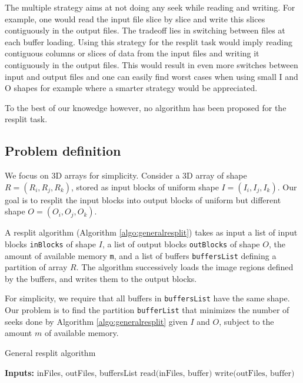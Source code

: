 \documentclass[conference]{IEEEtran}
\begin{document}
The multiple strategy aims at not doing any seek while reading and writing. For
example, one would read the input file slice by slice and write this slices
contiguously in the output files. The tradeoff lies in switching between files
at each buffer loading. Using this strategy for the resplit task would imply
reading contiguous columns or slices of data from the input files and writing it
contiguously in the output files. This would result in even more switches
between input and output files and one can easily find worst cases when using
small I and O shapes for example where a smarter strategy would be appreciated.

To the best of our knowedge however, no algorithm has been proposed for the resplit task.

\subsection{Problem definition}

We focus on 3D arrays for simplicity. Consider a 3D array of shape $R =
(R_i, R_j, R_k)$, stored as input blocks of uniform shape $I =
(I_i, I_j, I_k)$. Our goal is to resplit the input blocks into output
blocks of uniform but different shape $O = (O_i, O_j, O_k)$.

A resplit algorithm (Algorithm \ref{algo:generalresplit}) takes as input a
list of input blocks \texttt{inBlocks} of shape $I$, a list of output
blocks \texttt{outBlocks} of shape $O$, the amount of available memory
\texttt{m}, and a list of buffers \texttt{buffersList} defining a partition
of array $R$. The algorithm successively loads the image regions defined by
the buffers, and writes them to the output blocks.

For simplicity, we require that all buffers in \texttt{buffersList} have
the same shape. Our problem is to find the partition \texttt{bufferList}
that minimizes the number of seeks done by Algorithm
\ref{algo:generalresplit} given $I$ and $O$, subject to the amount $m$
of available memory.

\begin{algorithm}[H]
  \caption{General resplit algorithm}
  \label{algo:generalresplit}
  \begin{algorithmic}
    \STATE \textbf{Inputs:} {inFiles, outFiles, buffersList}
      \STATE $\textrm{read(inFiles, buffer)}$
      \STATE $\textrm{write(outFiles, buffer)}$
    \ENDFOR

  \end{algorithmic}
\end{algorithm}
\end{document}
